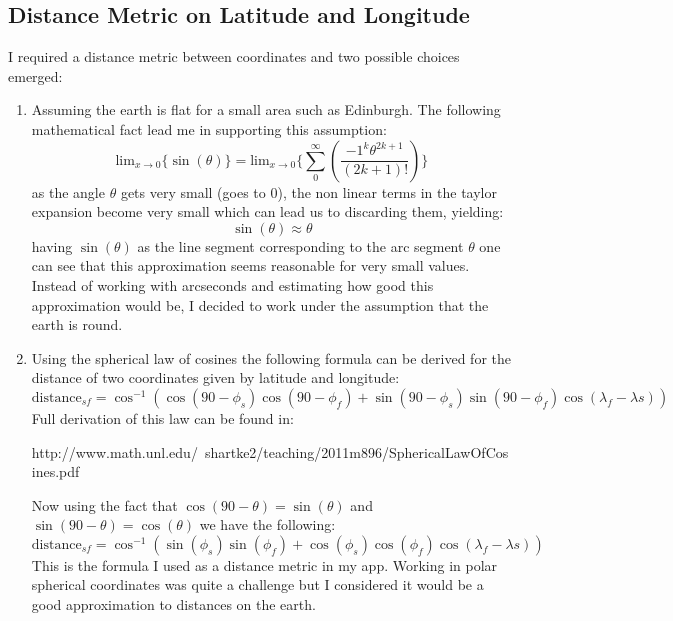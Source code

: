 \documentclass[11pt]{article}
\begin{document}
\subsection{Distance Metric on Latitude and Longitude}
I required a distance metric between coordinates and two possible choices emerged:
\begin{enumerate}
\item Assuming the earth is flat for a small area such as Edinburgh. The
following mathematical fact lead me in supporting this assumption:
\begin{equation*}
\mbox{lim}_{x\rightarrow 0}\{\sin(\theta)\}= \mbox{lim}_{x\rightarrow 0}\{\sum_{0}^{\infty}(\frac{-1^{k}\theta^{2k+1}}{(2k+1)!})\}
\end{equation*}
as the angle $\theta$ gets very small (goes to 0), the non linear terms in the taylor expansion become very small which can lead us to discarding them, yielding:
\begin{equation*}
\sin(\theta) \approx \theta
\end{equation*}
having $\sin(\theta)$ as the line segment corresponding to the arc segment $\theta$ one can see that this approximation seems reasonable for very small values. Instead of working with arcseconds and estimating how good this approximation would be, I decided to work under the assumption that the earth is round.
\item Using the spherical law of cosines the following formula can be derived for the distance of two coordinates given by latitude and longitude:
\begin{equation*}
\mbox{distance}_{sf} = \cos^{-1}(\cos(90-\phi_{s})\cos(90-\phi_{f}) + \sin(90-\phi_{s})\sin(90-\phi_{f})\cos(\lambda_{f}-\lambda{s}))
\end{equation*}
Full derivation of this law can be found in:
\begin{center}
  http://www.math.unl.edu/~shartke2/teaching/2011m896/SphericalLawOfCosines.pdf
 \end{center} 
Now using the fact that $\cos(90 - \theta) = \sin(\theta)$ and $\sin(90-\theta) = \cos(\theta)$
we have the following:
\begin{equation*}
\mbox{distance}_{sf} = \cos^{-1}(\sin(\phi_{s})\sin(\phi_{f}) + \cos(\phi_{s})\cos(\phi_{f})\cos(\lambda_{f}-\lambda{s}))
\end{equation*}
This is the formula I used as a distance metric in my app. Working in polar spherical coordinates was quite a challenge but I considered it would be a good approximation to distances on the earth.
\end{enumerate}
\end{document}
